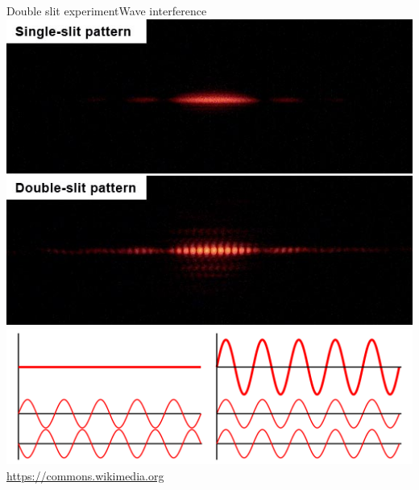 \documentclass[]{beamer}
\begin{document}
\begin{frame}{Double slit experiment}{Wave interference}
	\centering
	\includegraphics[viewport=0 90 560 120, clip, width=\textwidth]{defence/Single_slit_and_double_slit2}\\
	\includegraphics[width=\textwidth]{defence/Interference_of_two_waves}\\
	{\tiny\url{https://commons.wikimedia.org}}
\end{frame}
\end{document}
